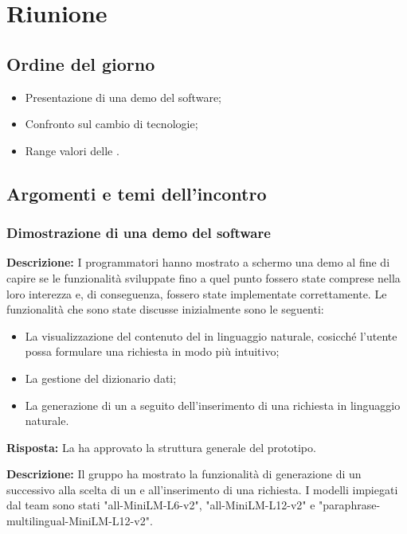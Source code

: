 \section{Riunione}
\subsection{Ordine del giorno}
\begin{itemize}
	\item Presentazione di una demo del software;
	\item Confronto sul cambio di tecnologie;
	\item Range valori delle .
\end{itemize}

\subsection{Argomenti e temi dell'incontro}

\subsubsection{Dimostrazione di una demo del software}

\par \textbf{Descrizione:} I programmatori hanno mostrato a schermo una demo al fine di capire se le funzionalità sviluppate fino a quel punto fossero state comprese nella loro interezza e, di conseguenza, fossero state implementate correttamente. Le funzionalità che sono state discusse inizialmente sono le seguenti: 
\begin{itemize}
	\item La visualizzazione del contenuto del  in linguaggio naturale, cosicché l'utente possa formulare una richiesta in modo più intuitivo;
	\item La gestione  del dizionario dati;
	\item La generazione di un  a seguito dell'inserimento di una richiesta in linguaggio naturale.
	
\end{itemize}

\par \textbf{Risposta:} La  ha approvato la struttura generale del prototipo.

\par \textbf{Descrizione:} Il gruppo ha mostrato la funzionalità di generazione di un  successivo alla scelta di un  e all'inserimento di una richiesta. I modelli impiegati dal team sono stati "all-MiniLM-L6-v2", "all-MiniLM-L12-v2" e "paraphrase-multilingual-MiniLM-L12-v2".

